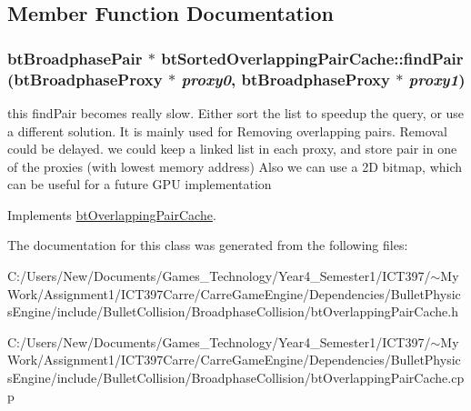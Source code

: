 \subsection{Member Function Documentation}
\hypertarget{classbt_sorted_overlapping_pair_cache_73b6665ffd9874f0575b72d07761ce8d}{
\subsubsection[findPair]{\setlength{\rightskip}{0pt plus 5cm}btBroadphasePair $\ast$ btSortedOverlappingPairCache::findPair (btBroadphaseProxy $\ast$ {\em proxy0}, \/  btBroadphaseProxy $\ast$ {\em proxy1})}}
\label{classbt_sorted_overlapping_pair_cache_73b6665ffd9874f0575b72d07761ce8d}


this findPair becomes really slow. Either sort the list to speedup the query, or use a different solution. It is mainly used for Removing overlapping pairs. Removal could be delayed. we could keep a linked list in each proxy, and store pair in one of the proxies (with lowest memory address) Also we can use a 2D bitmap, which can be useful for a future GPU implementation 

Implements \hyperlink{classbt_overlapping_pair_cache}{btOverlappingPairCache}.

The documentation for this class was generated from the following files:\begin{CompactItemize}
\item 
C:/Users/New/Documents/Games\_\-Technology/Year4\_\-Semester1/ICT397/$\sim$My Work/Assignment1/ICT397Carre/CarreGameEngine/Dependencies/BulletPhysicsEngine/include/BulletCollision/BroadphaseCollision/btOverlappingPairCache.h\item 
C:/Users/New/Documents/Games\_\-Technology/Year4\_\-Semester1/ICT397/$\sim$My Work/Assignment1/ICT397Carre/CarreGameEngine/Dependencies/BulletPhysicsEngine/include/BulletCollision/BroadphaseCollision/btOverlappingPairCache.cpp\end{CompactItemize}
